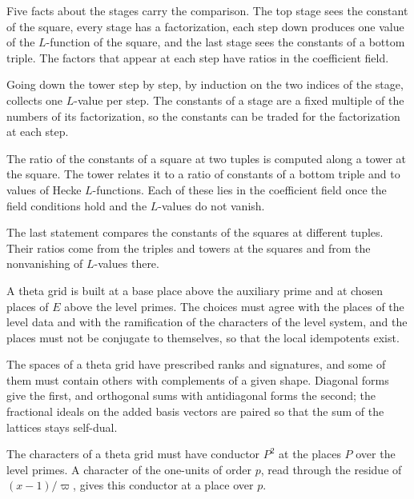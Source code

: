 Five facts about the stages carry the comparison. The top stage sees the constant of the square, every stage
has a factorization, each step down produces one value of the $L$-function of the square, and the last
stage sees the constants of a bottom triple. The factors that appear at each step have ratios in the
coefficient field.

Going down the tower step by step, by induction on the two indices of the stage, collects one $L$-value
per step. The constants of a stage are a fixed multiple of the numbers of its factorization, so the
constants can be traded for the factorization at each step.

The ratio of the constants of a square at two tuples is computed along a tower at the square. The
tower relates it to a ratio of constants of a bottom triple and to values of Hecke $L$-functions.
Each of these lies in the coefficient field once the field conditions hold and the $L$-values do not
vanish.

The last statement compares the constants of the squares at different tuples. Their ratios come
from the triples and towers at the squares and from the nonvanishing of $L$-values there.

A theta grid is built at a base place above the auxiliary prime and at chosen places of $E$ above the
level primes. The choices must agree with the places of the level data and with the ramification of
the characters of the level system, and the places must not be conjugate to themselves, so that the
local idempotents exist.

The spaces of a theta grid have prescribed ranks and signatures, and some of them must contain others with
complements of a given shape. Diagonal forms give the first, and orthogonal sums with antidiagonal forms the
second; the fractional ideals on the added basis vectors are paired so that the sum of the lattices stays
self-dual.

The characters of a theta grid must have conductor $P^2$ at the places $P$ over the level primes. A
character of the one-units of order $p$, read through the residue of $(x-1)/\varpi$, gives this conductor at a
place over $p$.

